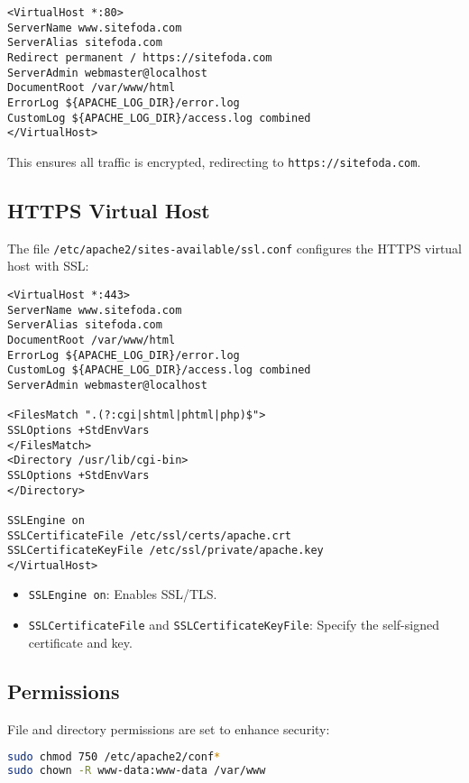 \documentclass[12pt]{report}
\begin{document}
\begin{lstlisting}[caption={HTTP Virtual Host Configuration}]
<VirtualHost *:80>
ServerName www.sitefoda.com
ServerAlias sitefoda.com
Redirect permanent / https://sitefoda.com
ServerAdmin webmaster@localhost
DocumentRoot /var/www/html
ErrorLog ${APACHE_LOG_DIR}/error.log
CustomLog ${APACHE_LOG_DIR}/access.log combined
</VirtualHost>
\end{lstlisting}

This ensures all traffic is encrypted, redirecting to \texttt{https://sitefoda.com}.

\subsection*{HTTPS Virtual Host}
The file \texttt{/etc/apache2/sites-available/ssl.conf} configures the HTTPS virtual host with SSL:

\begin{lstlisting}[caption={HTTPS Virtual Host Configuration}]
<VirtualHost *:443>
ServerName www.sitefoda.com
ServerAlias sitefoda.com
DocumentRoot /var/www/html
ErrorLog ${APACHE_LOG_DIR}/error.log
CustomLog ${APACHE_LOG_DIR}/access.log combined
ServerAdmin webmaster@localhost

<FilesMatch ".(?:cgi|shtml|phtml|php)$">
SSLOptions +StdEnvVars
</FilesMatch>
<Directory /usr/lib/cgi-bin>
SSLOptions +StdEnvVars
</Directory>

SSLEngine on
SSLCertificateFile /etc/ssl/certs/apache.crt
SSLCertificateKeyFile /etc/ssl/private/apache.key
</VirtualHost>
\end{lstlisting}

\begin{itemize}
\item \texttt{SSLEngine on}: Enables SSL/TLS.
\item \texttt{SSLCertificateFile} and \texttt{SSLCertificateKeyFile}: Specify the self-signed certificate and key.
\end{itemize}

\subsection*{Permissions}
File and directory permissions are set to enhance security:

\begin{lstlisting}[language=bash, caption={Permission Commands}]
sudo chmod 750 /etc/apache2/conf*
sudo chown -R www-data:www-data /var/www
\end{lstlisting}
\end{document}
